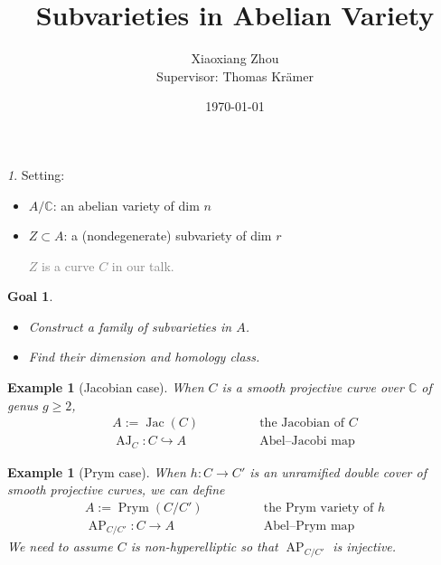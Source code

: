 \documentclass[pdf]{beamer}
\title{Subvarieties in Abelian Variety}
\author[Xiaoxiang Zhou]{Xiaoxiang Zhou\\[10mm]{\small Supervisor: Thomas Krämer
}}
\institute[HU berlin]{Humboldt-Universität zu Berlin}
\date{\today}
\numberwithin{equation}{section}
\theoremstyle{plain}
\newtheorem{eg}[theorem]{Example}
\newtheorem{goal}[theorem]{Goal}
\theoremstyle{plain}
\theoremstyle{remark}
\newtheorem{short}{ }
\newcommand*{\ignore}[1]{\textcolor{gray}{#1}}
\DeclareMathOperator{\Jac}{\operatorname{Jac}}
\DeclareMathOperator{\Prym}{\operatorname{Prym}}
\DeclareMathOperator{\AJ}{\operatorname{AJ}}
\DeclareMathOperator{\AP}{\operatorname{AP}}
\begin{document}
\begin{frame}
	\titlepage
\end{frame}
\begin{frame}[fragile]
\begin{short}
Setting:
\begin{itemize}
	\item $A/\mathbb{C}$: an abelian variety of dim $n$
	\item $Z \subset A$: a (nondegenerate) subvariety of dim $r$

\ignore{$Z$ is a curve $C$ in our talk.}
	
\end{itemize}
\end{short}

%	

\begin{goal}
\begin{itemize}
	\item Construct a family of subvarieties in $A$.
	\item Find their dimension and homology class.
	
\end{itemize}
\end{goal}
\end{frame}

\begin{frame}[fragile]
\begin{eg}[Jacobian case]
When $C$ is a smooth projective curve over $\mathbb{C}$ of genus $g \geqslant 2$, 
\begin{equation*}
\begin{aligned}
 A:=\Jac(C) &\qquad\qquad \text{the Jacobian of $C$}  \\ 
 \AJ_C:C \hookrightarrow A &\qquad\qquad \text{Abel--Jacobi map}
\end{aligned}
\end{equation*}
\end{eg}

\begin{eg}[Prym case]
When $h:C \longrightarrow C'$ is an unramified double cover of smooth projective curves, we can define
\begin{equation*}
\begin{aligned}
 A:=\Prym(C/C') &\qquad\qquad \text{the Prym variety of $h$}  \\ 
 \AP_{C/C'}:C \longrightarrow A &\qquad\qquad \text{Abel--Prym map}
\end{aligned}
\end{equation*}
We need to assume $C$ is non-hyperelliptic so that $\AP_{C/C'}$ is injective.
\end{eg}
\end{frame}
\end{document}
